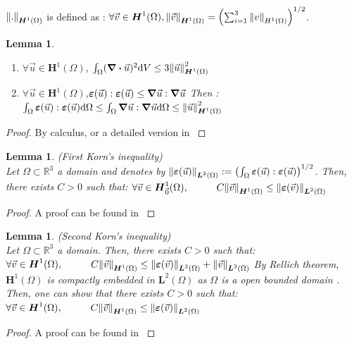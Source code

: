 \documentclass[a4paper,12pt,twoside]{report}
\newcommand{\mtr}{\mathbb{R}}
\newcommand{\dif}{\mathrm{d}}
\newtheorem{lemma}[theorem]{Lemma}
\begin{document}
$\norm{.}_{\boldsymbol H^1(\Omega)}$ is defined as : $\forall \vec v \in \boldsymbol H^1(\Omega), \norm{\vec v}_{\boldsymbol H^1(\Omega)} = \left(\sum_{i=1}^3 \norm{v}_{H^1(\Omega)} \right)^{1/2}$. 
\begin{lemma}
\begin{enumerate}
    \item $\displaystyle \forall \vec u \in \boldsymbol H^1(\Omega)$, $\int_\Omega (\div \vec u)^2 \dif V \leq 3 \norm{\vec u}_{\boldsymbol H^1(\Omega)}^2$
    \item $\displaystyle \forall \vec u \in \boldsymbol H^1(\Omega)$,$\boldsymbol \varepsilon(\vec u) : \boldsymbol \varepsilon(\vec u) \leq \grad \vec u : \grad \vec u$
    Then : $\int_\Omega \boldsymbol \varepsilon(\vec u) : \boldsymbol \varepsilon(\vec u) \dif\Omega \leq \int_\Omega \grad \vec u : \grad \vec u \dif \Omega \leq \norm{\vec u}_{\boldsymbol H^1(\Omega)}^2$
\end{enumerate}
\end{lemma}
\begin{proof}
    By calculus, or a detailed version in \cite{cinatl_finite}
\end{proof}

\begin{lemma}
\label{Korn1}
    (First Korn's inequality) \\
    Let $\Omega \subset \mtr^3$ a domain and denotes by $\norm{\boldsymbol \varepsilon(\vec u)}_{\boldsymbol L^2(\Omega)} := \left(\int_\Omega \boldsymbol \varepsilon(\vec u):\boldsymbol \varepsilon(\vec u)\right)^{1/2}$. Then, there exists $C > 0$ such that: $\forall \vec v \in \boldsymbol H^1_{\vec 0}(\Omega), \hspace{1cm} C\norm{\vec v}_{\boldsymbol H^1(\Omega)} \leq \norm{\boldsymbol \varepsilon(\vec v)}_{\boldsymbol L^2(\Omega)}$
\end{lemma}
\begin{proof}
    A proof can be found in \cite{brenner_mathematical_2008}
\end{proof}

\begin{lemma}
\label{Korn2}
    (Second Korn's inequality) \\
    Let $\Omega \subset \mtr^3$ a domain. Then, there exists $C > 0$ such that: 
    $\forall \vec v \in \boldsymbol H^1(\Omega), \hspace{1cm} C\norm{\vec v}_{\boldsymbol H^1(\Omega)} \leq \norm{\boldsymbol \varepsilon(\vec v)}_{\boldsymbol L^2(\Omega)} + \norm{\vec v}_{\boldsymbol L^2(\Omega)}$
    By Rellich theorem, $\boldsymbol H^1(\Omega)$ is compactly embedded in $\boldsymbol L^2(\Omega)$ as $\Omega$ is a open bounded domain . Then, one can show that there exists $C > 0$ such that:
    $\forall \vec v \in \boldsymbol H^1(\Omega), \hspace{1cm} C\norm{\vec v}_{\boldsymbol H^1(\Omega)} \leq \norm{\boldsymbol \varepsilon(\vec v)}_{\boldsymbol L^2(\Omega)}$
\end{lemma}
\begin{proof}
    A proof can be found in \cite{brenner_mathematical_2008}
\end{proof}
\end{document}
